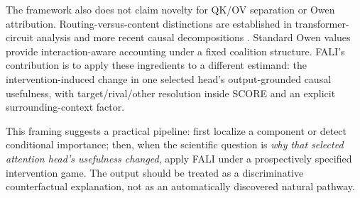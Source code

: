 The framework also does not claim novelty for QK/OV separation or Owen attribution. Routing-versus-content distinctions are established in transformer-circuit analysis and more recent causal decompositions \citep{elhage2021mathematical,franco2025attentioncausal,wang2026fewshot}. Standard Owen values provide interaction-aware accounting under a fixed coalition structure. FALI's contribution is to apply these ingredients to a different estimand: the intervention-induced change in one selected head's output-grounded causal usefulness, with target/rival/other resolution inside SCORE and an explicit surrounding-context factor.

This framing suggests a practical pipeline: first localize a component or detect conditional importance; then, when the scientific question is \emph{why that selected attention head's usefulness changed}, apply FALI under a prospectively specified intervention game. The output should be treated as a discriminative counterfactual explanation, not as an automatically discovered natural pathway.
